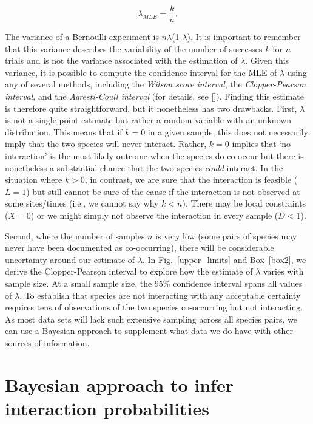 \documentclass[12pt]{article}
\begin{document}
\begin{spacing}{2.0}
      \begin{equation}
        \lambda_{MLE} = \frac{k}{n}  .
        \label{theta_MLE}
      \end{equation}

  The variance of a Bernoulli experiment is $n\lambda$(1-$\lambda$). It is important to remember that this variance describes the variability of the number of successes $k$ for $n$ trials and is not the variance associated with the estimation of $\lambda$. Given this variance, it is possible to compute the confidence interval for the MLE of $\lambda$ using any of several methods, including the \emph{Wilson score interval}, the \emph{Clopper-Pearson interval}, and the \emph{Agresti-Coull interval} (for details, see [\citealp{Brown2001}]). Finding this estimate is therefore quite straightforward, but it nonetheless has two drawbacks. First, $\lambda$ is not a single point estimate but rather a random variable with an unknown distribution. This means that if $k = 0$ in a given sample, this does not necessarily imply that the two species will never interact. Rather, $k = 0$ implies that `no interaction' is the most likely outcome when the species do co-occur but there is nonetheless a substantial chance that the two species \emph{could} interact. In the situation where $k>0$, in contrast, we are sure that the interaction is feasible ($L = 1$) but still cannot be sure of the cause if the interaction is not observed at some sites/times (i.e., we cannot say why $k<n$). There may be local constraints ($X=0$) or we might simply not observe the interaction in every sample ($D<1$). 


  Second, where the number of samples $n$ is very low (some pairs of species may never have been documented as co-occurring), there will be considerable uncertainty around our estimate of $\lambda$. In Fig.~\ref{upper_limits} and Box~\ref{box2}, we derive the Clopper-Pearson interval to explore how the estimate of $\lambda$ varies with sample size. At a small sample size, the 95\% confidence interval spans all values of $\lambda$. To establish that species are not interacting with any acceptable certainty requires tens of observations of the two species co-occurring but not interacting. As most data sets will lack such extensive sampling across all species pairs, we can use a Bayesian approach to supplement what data we do have with other sources of information.


\section*{Bayesian approach to infer interaction probabilities}


\end{spacing}
\end{document}
